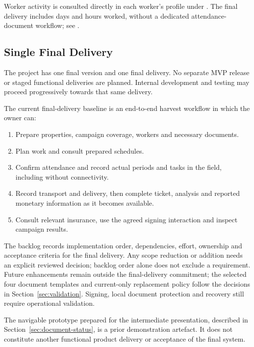 Worker activity is consulted directly in each worker's profile under
. The final delivery includes days and hours worked, without a
dedicated attendance-document workflow; see .

\subsection{Single Final Delivery}
\label{sec:mvp-proposal}
\label{sec:final-delivery}

The project has one final version and one final delivery. No separate MVP release
or staged functional deliveries are planned. Internal development and testing may
proceed progressively towards that same delivery.

The current final-delivery baseline is an end-to-end
harvest workflow in which the owner can:

\begin{enumerate}
    \item Prepare properties, campaign coverage,
    workers and necessary documents.

    \item Plan work and consult prepared schedules.

    \item Confirm attendance and record
    actual periods and tasks in the field,
    including without connectivity.

    \item Record transport and delivery,
    then complete ticket, analysis
    and reported monetary information
    as it becomes available.

    \item Consult relevant insurance,
    use the agreed signing interaction
    and inspect campaign results.
\end{enumerate}

The backlog records implementation order, dependencies, effort, ownership and
acceptance criteria for the final delivery. Any scope reduction or addition needs
an explicit reviewed decision; backlog order alone does not exclude a requirement.
Future enhancements remain outside the final-delivery commitment; the selected four document templates and current-only replacement policy follow the decisions in Section~\ref{sec:validation}. Signing, local document protection and recovery still
require operational validation.

The navigable prototype prepared for the intermediate presentation, described in
Section~\ref{sec:document-status}, is a prior demonstration artefact. It does not
constitute another functional product delivery or acceptance of the final system.


